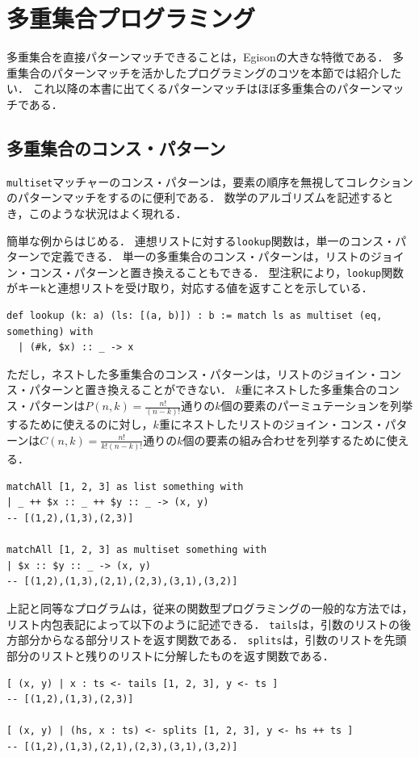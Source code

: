 \section{多重集合プログラミング}

多重集合を直接パターンマッチできることは，Egisonの大きな特徴である．
多重集合のパターンマッチを活かしたプログラミングのコツを本節では紹介したい．
これ以降の本書に出てくるパターンマッチはほぼ多重集合のパターンマッチである．

\subsection{多重集合のコンス・パターン}

\lstinline{multiset}マッチャーのコンス・パターンは，要素の順序を無視してコレクションのパターンマッチをするのに便利である．
数学のアルゴリズムを記述するとき，このような状況はよく現れる．

簡単な例からはじめる．
連想リストに対する\lstinline{lookup}関数は，単一のコンス・パターンで定義できる．
単一の多重集合のコンス・パターンは，リストのジョイン・コンス・パターンと置き換えることもできる．
型注釈により，\lstinline{lookup}関数がキー\lstinline{k}と連想リストを受け取り，対応する値を返すことを示している．
\begin{lstlisting}[language=egison,numbers=none]
def lookup (k: a) (ls: [(a, b)]) : b := match ls as multiset (eq, something) with
  | (#k, $x) :: _ -> x
\end{lstlisting}
ただし，ネストした多重集合のコンス・パターンは，リストのジョイン・コンス・パターンと置き換えることができない．
$k$重にネストした多重集合のコンス・パターンは$P(n,k) = \frac{n!}{(n-k)!}$通りの$k$個の要素のパーミュテーションを列挙するために使えるのに対し，$k$重にネストしたリストのジョイン・コンス・パターンは$C(n,k) = \frac{n!}{k!(n-k)!}$通りの$k$個の要素の組み合わせを列挙するために使える．
\begin{lstlisting}[language=egison,numbers=none]
matchAll [1, 2, 3] as list something with
| _ ++ $x :: _ ++ $y :: _ -> (x, y)
-- [(1,2),(1,3),(2,3)]

matchAll [1, 2, 3] as multiset something with
| $x :: $y :: _ -> (x, y)
-- [(1,2),(1,3),(2,1),(2,3),(3,1),(3,2)]
\end{lstlisting}
上記と同等なプログラムは，従来の関数型プログラミングの一般的な方法では，リスト内包表記によって以下のように記述できる．
\lstinline{tails}は，引数のリストの後方部分からなる部分リストを返す関数である．
\lstinline{splits}は，引数のリストを先頭部分のリストと残りのリストに分解したものを返す関数である．
\begin{lstlisting}[language=egison,numbers=none]
[ (x, y) | x : ts <- tails [1, 2, 3], y <- ts ]
-- [(1,2),(1,3),(2,3)]

[ (x, y) | (hs, x : ts) <- splits [1, 2, 3], y <- hs ++ ts ]
-- [(1,2),(1,3),(2,1),(2,3),(3,1),(3,2)]
\end{lstlisting}

